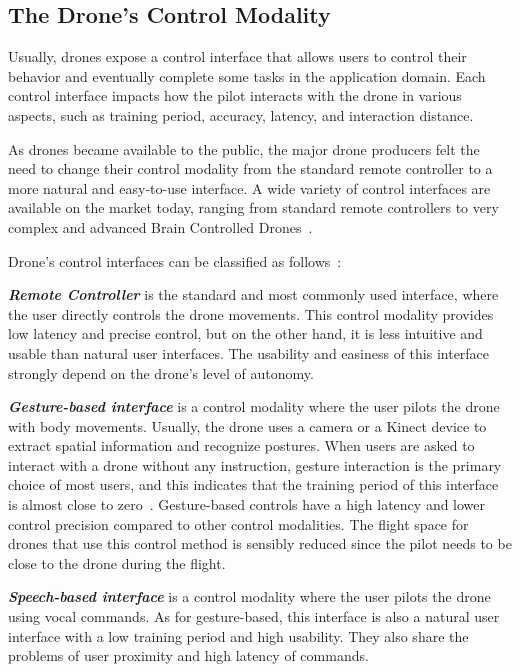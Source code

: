 \subsection{The Drone's Control Modality}\label{subsec:hdi_drone_control_mod}
Usually, drones expose a control interface that allows users to control their behavior and eventually complete some tasks in the application domain.
Each control interface impacts how the pilot interacts with the drone in various aspects, 
such as training period, accuracy, latency, and interaction distance.

As drones became available to the public, the major drone producers felt the need to change their control modality 
from the standard remote controller to a more natural and easy-to-use interface.
A wide variety of control interfaces are available on the market today, 
ranging from standard remote controllers to very complex and advanced Brain Controlled Drones~\cite{lafleur2013quadcopterBCI}.

Drone's control interfaces can be classified as follows~\cite{tezza2019hdi}:

\textbf{\textit{Remote Controller}} is the standard and most commonly used interface, where the user directly controls the drone movements.
This control modality provides low latency and precise control, but on the other hand, it is less intuitive and usable 
than natural user interfaces. The usability and easiness of this interface strongly depend on the drone's level of autonomy.

\textbf{\textit{Gesture-based interface}} is a control modality where the user pilots the drone with body movements.
Usually, the drone uses a camera or a Kinect device to extract spatial information and recognize postures. 
When users are asked to interact with a drone without any instruction, gesture interaction is the primary choice of most users, 
and this indicates that the training period of this interface is almost close to zero~\cite{cauchard2015droneAndMe}. 
Gesture-based controls have a high latency and lower control precision compared to other control modalities. 
The flight space for drones that use this control method is sensibly reduced since the pilot needs to be close to the drone during the flight.

\textbf{\textit{Speech-based interface}} is a control modality where the user pilots the drone using vocal commands. 
As for gesture-based, this interface is also a natural user interface with a low training period and high usability.
They also share the problems of user proximity and high latency of commands.  

